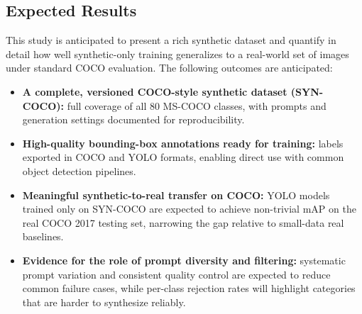 \documentclass[conference]{IEEEtran}
\begin{document}
\subsection{Expected Results}
This study is anticipated to present a rich synthetic dataset and quantify in detail how well synthetic-only training generalizes to a real-world set of images under standard COCO evaluation.
The following outcomes are anticipated:

\begin{itemize}
    \item \textbf{A complete, versioned COCO-style synthetic dataset (SYN-COCO):} full coverage of all 80 MS-COCO classes, with prompts and generation settings documented for reproducibility.
    \item \textbf{High-quality bounding-box annotations ready for training:} labels exported in COCO and YOLO formats, enabling direct use with common object detection pipelines.
    \item \textbf{Meaningful synthetic-to-real transfer on COCO:} YOLO models trained only on SYN-COCO are expected to achieve non-trivial mAP on the real COCO 2017 testing set, narrowing the gap relative to small-data real baselines.
     \item \textbf{Evidence for the role of prompt diversity and filtering:} systematic prompt variation and consistent quality control are expected to reduce common failure cases, while per-class rejection rates will highlight categories that are harder to synthesize reliably.
\end{itemize}
\end{document}

